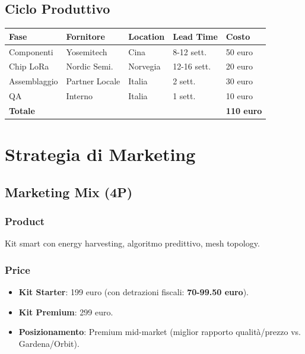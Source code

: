 \documentclass[11pt,a4paper]{report}
\begin{document}
\section{Ciclo Produttivo}
\begin{longtable}{|L{3cm}|L{2.5cm}|L{2cm}|L{2cm}|C{1.5cm}|}
\hline
{\bf Fase} & {\bf Fornitore} & {\bf Location} & {\bf Lead Time} & {\bf Costo} \\ \hline
Componenti & Yosemitech & Cina & 8-12 sett. & 50 euro \\
Chip LoRa & Nordic Semi. & Norvegia & 12-16 sett. & 20 euro \\
Assemblaggio & Partner Locale & Italia & 2 sett. & 30 euro \\
QA & Interno & Italia & 1 sett. & 10 euro \\ \hline
{\bf Totale} & & & & {\bf 110 euro} \\ \hline
\end{longtable}

\chapter{Strategia di Marketing}
\label{ch:marketing}

\section{Marketing Mix (4P)}
\subsection{Product}
Kit smart con energy harvesting, algoritmo predittivo, mesh topology.

\subsection{Price}
\begin{itemize}
\item {\bf Kit Starter}: 199 euro (con detrazioni fiscali: {\bf 70-99.50 euro}).
\item {\bf Kit Premium}: 299 euro.
\item {\bf Posizionamento}: Premium mid-market (miglior rapporto qualità/prezzo vs. Gardena/Orbit).
\end{itemize}
\end{document}
